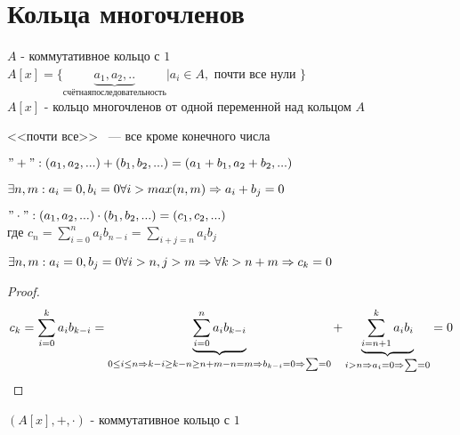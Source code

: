 \section{Кольца многочленов}
	\begin{Def}
		$A$ - коммутативное кольцо с $1$\\
		$A[x] = \lbrace \underbrace{a_1, a_2, .. }_{счётная последовательность} | a_i \in A,$ почти все нули $\rbrace$\\
		$A[x]$ - кольцо многочленов от одной переменной над кольцом $A$\\
	\end{Def}
		 
	\begin{Rem}
		<<почти все>> ~--- все кроме конечного числа\\
	\end{Rem}
	 
	\begin{Def}	
		$ "+": (a_1, a_2, ...) + (b_1, b_2, ...) = (a_1 + b_1, a_2 + b_2, ...) $\\
	\end{Def}
	
	\begin{Rem}
		$ \exists n, m: a_i = 0, b_i = 0 \forall i > max(n, m) \Rightarrow a_i + b_j = 0 $\\
	\end{Rem}
	 
	\begin{Def}	
		$ "\cdot": (a_1, a_2, ...) \cdot (b_1, b_2, ...) = (c_1, c_2, ...) $\\
		где $ c_n = \sum_{i = 0}^n a_ib_{n - i} = \sum_{i + j = n} a_ib_j $\\
	\end{Def}
		 
	\begin{Rem}
		$ \exists n, m: a_i = 0, b_j = 0 \forall i > n, j > m \Rightarrow \forall k > n + m \Rightarrow c_k = 0 $\\
	\end{Rem}
	
	\begin{proof}
		$$ c_k = \sum_{i = 0}^k a_ib_{k - i} = \underbrace{\sum_{i=0}^n a_ib_{k - i}}_{ 0 \leq i \leq n \Rightarrow
		 k - i \geq k - n \geq n + m - n = m \Rightarrow b_{k - i} = 0 \Rightarrow \sum = 0} +
		 \underbrace{\sum_{i = n + 1}^k a_ib_i}_{i > n \Rightarrow a_i = 0 \Rightarrow \sum = 0} = 0 $$
	\end{proof}	
	
	\begin{theorem}{}
		$(A[x], +, \cdot)$ - коммутативное кольцо с $1$
	\end{theorem}

